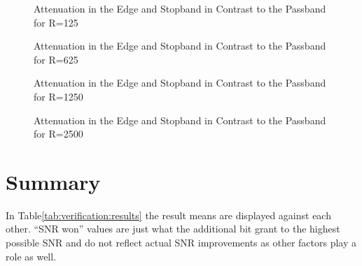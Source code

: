 \begin{figure}
    \centering
    
    \caption[Attenuation in the Edge and Stopband in Contrast to the Passband for R=125]{%
    Attenuation in the Edge and Stopband in Contrast to the Passband for R=125%
    }
    \label{fig:verification:fB125}
\end{figure}

\begin{figure}
    \centering
    
    \caption[Attenuation in the Edge and Stopband in Contrast to the Passband for R=625]{%
    Attenuation in the Edge and Stopband in Contrast to the Passband for R=625%
    }
    \label{fig:verification:fB625}
\end{figure}

\begin{figure}
    \centering
    
    \caption[Attenuation in the Edge and Stopband in Contrast to the Passband for R=1250]{%
    Attenuation in the Edge and Stopband in Contrast to the Passband for R=1250%
    }
    \label{fig:verification:fB5}
\end{figure}

\begin{figure}
    \centering
    
    \caption[Attenuation in the Edge and Stopband in Contrast to the Passband for R=2500]{%
    Attenuation in the Edge and Stopband in Contrast to the Passband for R=2500%
    }
    \label{fig:verification:fB5}
\end{figure}

\section{Summary}
\label{sec:verification:summary}

In Table\ref{tab:verification:results} the result means are displayed against each other. ``SNR won'' values are just what the additional bit grant to the highest possible SNR and do not reflect actual SNR improvements as other factors play a role as well.

